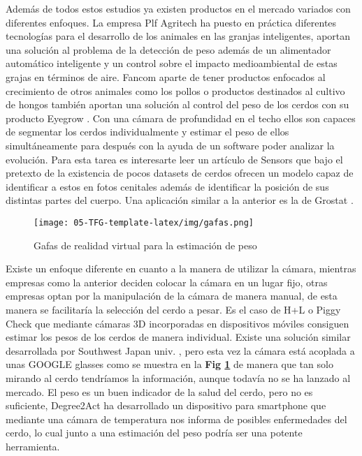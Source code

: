 ﻿\documentclass[10pt,a4paper,twocolumn,twoside]{article}
\begin{document}
Además de todos estos estudios ya existen productos en el mercado variados con diferentes enfoques.
La empresa Plf Agritech \cite{PLF} ha puesto en práctica diferentes tecnologías para el desarrollo de los animales en las granjas inteligentes, aportan una solución al problema de la detección de peso además de un alimentador automático inteligente y un control sobre el impacto medioambiental de estas grajas en términos de aire.
Fancom \cite{fancom} aparte de tener productos enfocados al crecimiento de otros animales como los pollos o productos destinados al cultivo de hongos también aportan una solución al control del peso de los cerdos con su producto Eyegrow \cite{fancomvideo}. Con una cámara de profundidad en el techo ellos son capaces de segmentar los cerdos individualmente y estimar el peso de ellos simultáneamente para después con la ayuda de un software poder analizar la evolución. Para esta tarea es interesarte leer un artículo de Sensors \cite{deteccion} que bajo el pretexto de la existencia de pocos datasets de cerdos ofrecen un modelo capaz de identificar a estos en fotos cenitales además de identificar la posición de sus distintas partes del cuerpo. Una aplicación similar a la anterior es la de Grostat \cite{GroStat}.


\begin{figure}[!htb]
\centering
\texttt{[image: 05-TFG-template-latex/img/gafas.png]}
\caption{Gafas de realidad virtual para la estimación de peso}
\label{gafas}
\end{figure}


Existe un enfoque diferente en cuanto a la manera de utilizar la cámara, mientras empresas como la anterior deciden colocar la cámara en un lugar fijo, otras empresas optan por la manipulación de la cámara de manera manual, de esta manera se facilitaría la selección del cerdo a pesar. Es el caso de H+L \cite{H+L} o Piggy Check \cite{piggycheck} que mediante cámaras 3D incorporadas en dispositivos móviles consiguen estimar los pesos de los cerdos de manera individual. Existe una solución similar desarrollada por Southwest Japan univ. \cite{japon}, pero esta vez la cámara está acoplada a unas GOOGLE glasses \cite{google} como se muestra en la \textbf{Fig \ref{gafas}} de manera que tan solo mirando al cerdo tendríamos la información, aunque todavía no se ha lanzado al mercado.
El peso es un buen indicador de la salud del cerdo, pero no es suficiente, Degree2Act \cite{degree} ha desarrollado un dispositivo para smartphone que mediante una cámara de temperatura nos informa de posibles enfermedades del cerdo, lo cual junto a una estimación del peso podría ser una potente herramienta.
\end{document}
